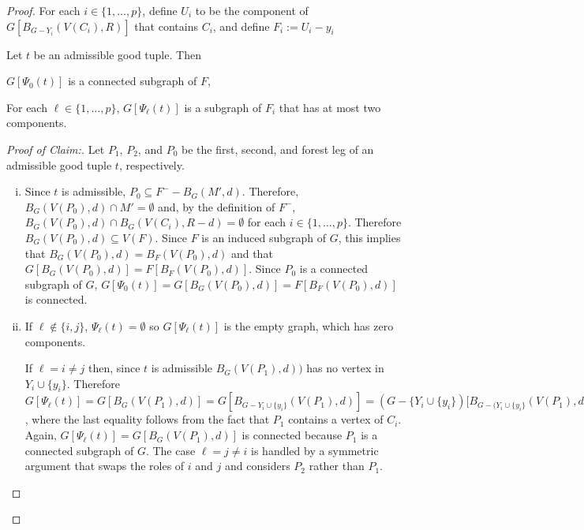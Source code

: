 \documentclass{patmorin}
\newcommand{\pat}[1]{\textcolor{Blue}{Pat: #1}}
\newcommand{\piotr}[1]{\textcolor{red}{Piotr: #1}}
\newenvironment{clmproof}{\begin{proof}[Proof of Claim:]\renewcommand{\qedsymbol}{\rule{1ex}{1ex}}}{\end{proof}}
\begin{document}
\begin{proof}
For each $i\in\{1,\ldots,p\}$, define $U_i$ to be the component of $G[B_{G-Y_i}(V(C_i),R)]$ that contains $C_i$, and define $F_i:=U_i-y_i$

\begin{clm}
Let $t$ be an admissible good tuple. Then
\begin{compactenum}[(i)]
\item $G[\Psi_0(t)]$ is a connected subgraph of $F$,
\item For each $\ell\in\{1,\ldots,p\}$, $G[\Psi_\ell(t)]$ is a subgraph of $F_i$ that has at most two components.

\end{compactenum}
\end{clm}

\begin{clmproof}
  Let $P_1$, $P_2$, and $P_0$ be the first, second, and forest leg of an admissible good tuple $t$, respectively.

  \begin{enumerate}[(i)]
    \item  Since $t$ is admissible, $P_0\subseteq
    F^--B_G(M',d)$.
    Therefore, $B_G(V(P_0),d)\cap M'=\emptyset$ and, by the definition of $F^-$, $B_G(V(P_0),d)\cap B_G(V(C_i),R-d)=\emptyset$ for each $i\in\{1,\ldots,p\}$.  Therefore $B_G(V(P_0),d)\subseteq V(F)$.  Since $F$ is an induced subgraph of $G$, this implies that $B_G(V(P_0),d)=B_F(V(P_0),d)$ and that $G[B_G(V(P_0),d)]=F[B_F(V(P_0),d)]$. Since $P_0$ is a connected subgraph of $G$, $G[\Psi_0(t)]=G[B_G(V(P_0),d)]=F[B_F(V(P_0),d)]$ is connected.

    \item If $\ell\not\in\{i,j\}$, $\Psi_\ell(t)=\emptyset$ so $G[\Psi_\ell(t)]$ is the empty graph, which has zero components.

    If $\ell=i\neq j$ then, since $t$ is admissible $B_G(V(P_1),d))$ has no vertex in $Y_i\cup\{y_i\}$.  Therefore $G[\Psi_\ell(t)]=G[B_G(V(P_1),d)]= G[B_{G-Y_i\cup\{y_i\}}(V(P_1),d)]=(G-\{Y_i\cup\{y_i\})[B_{G-(Y_i\cup\{y_i\}}(V(P_1),d)=F_i[B_{F_i}(V(P_1),d)]$, where the last equality follows from the fact that $P_1$ contains a vertex of $C_i$.  Again,  $G[\Psi_\ell(t)]=G[B_G(V(P_1),d)]$ is connected because $P_1$ is a connected subgraph of $G$.  The case $\ell=j\neq i$ is handled by a symmetric argument that swaps the roles of $i$ and $j$ and considers $P_2$ rather than $P_1$.


\end{enumerate}
\end{clmproof}
\end{proof}
\end{document}
